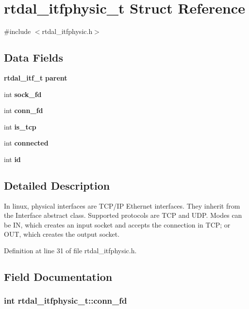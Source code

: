 \section{rtdal\-\_\-itfphysic\-\_\-t Struct Reference}
\label{structrtdal__itfphysic__t}


{\ttfamily \#include $<$rtdal\-\_\-itfphysic.\-h$>$}

\subsection*{Data Fields}
\begin{DoxyCompactItemize}
\item 
{\bf rtdal\-\_\-itf\-\_\-t} {\bf parent}
\item 
int {\bf sock\-\_\-fd}
\item 
int {\bf conn\-\_\-fd}
\item 
int {\bf is\-\_\-tcp}
\item 
int {\bf connected}
\item 
int {\bf id}
\end{DoxyCompactItemize}


\subsection{Detailed Description}
In linux, physical interfaces are T\-C\-P/\-I\-P Ethernet interfaces. They inherit from the Interface abstract class. Supported protocols are T\-C\-P and U\-D\-P. Modes can be I\-N, which creates an input socket and accepts the connection in T\-C\-P; or O\-U\-T, which creates the output socket. 

Definition at line 31 of file rtdal\-\_\-itfphysic.\-h.



\subsection{Field Documentation}
\subsubsection[{conn\-\_\-fd}]{\setlength{\rightskip}{0pt plus 5cm}int rtdal\-\_\-itfphysic\-\_\-t\-::conn\-\_\-fd}\label{structrtdal__itfphysic__t_a1a82ebdc90895ab772a93103b7a6940e}


